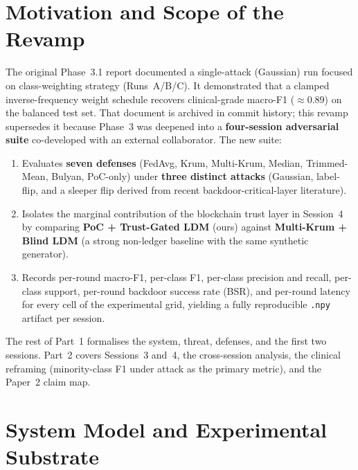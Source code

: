 \documentclass[11pt,a4paper]{article}
\begin{document}
\tableofcontents
\newpage

\section{Motivation and Scope of the Revamp}
\label{sec:scope}

The original Phase~3.1 report documented a single-attack (Gaussian) run
focused on class-weighting strategy (Runs~A/B/C). It demonstrated that a
clamped inverse-frequency weight schedule recovers clinical-grade macro-F1
($\approx 0.89$) on the balanced test set. That document is archived in
commit history; this revamp supersedes it because Phase~3 was deepened
into a \textbf{four-session adversarial suite} co-developed with an
external collaborator. The new suite:

\begin{enumerate}[nosep]
    \item Evaluates \textbf{seven defenses} (FedAvg, Krum, Multi-Krum, Median,
          Trimmed-Mean, Bulyan, PoC-only) under \textbf{three distinct
          attacks} (Gaussian, label-flip, and a sleeper flip derived from
          recent backdoor-critical-layer literature).
    \item Isolates the marginal contribution of the blockchain trust layer
          in Session~4 by comparing \textbf{PoC + Trust-Gated LDM}
          (ours) against \textbf{Multi-Krum + Blind LDM} (a strong
          non-ledger baseline with the same synthetic generator).
    \item Records per-round macro-F1, per-class F1, per-class precision and
          recall, per-class support, per-round backdoor success rate (BSR),
          and per-round latency for every cell of the experimental grid,
          yielding a fully reproducible \texttt{.npy} artifact per session.
\end{enumerate}

The rest of Part~1 formalises the system, threat, defenses, and the first
two sessions. Part~2 covers Sessions~3 and~4, the cross-session analysis,
the clinical reframing (minority-class F1 under attack as the primary
metric), and the Paper~2 claim map.

\section{System Model and Experimental Substrate}
\label{sec:system}
\end{document}
